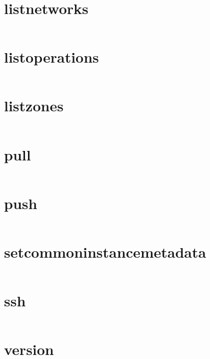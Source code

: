 \section{listnetworks}
\begin{lstlisting}[language=Bash]
\end{lstlisting}

\section{listoperations}
\begin{lstlisting}[language=Bash]
\end{lstlisting}

\section{listzones}
\begin{lstlisting}[language=Bash]
\end{lstlisting}

\section{pull}
\begin{lstlisting}[language=Bash]
\end{lstlisting}

\section{push}
\begin{lstlisting}[language=Bash]
\end{lstlisting}

\section{setcommoninstancemetadata}
\begin{lstlisting}[language=Bash]
\end{lstlisting}

\section{ssh}
\begin{lstlisting}[language=Bash]
\end{lstlisting}

\section{version}
\begin{lstlisting}[language=Bash]
\end{lstlisting}


